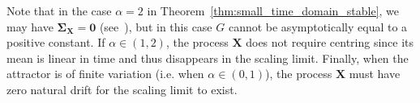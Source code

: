 \documentclass[en,oneside,bbfont,article]{amsart}
\theoremstyle{remark}
\theoremstyle{definition}
\theoremstyle{definition}
\newcommand\1{\mathds{1}}
\begin{document}
Note that in the case $\alpha=2$ in Theorem~\ref{thm:small_time_domain_stable},
we may have $\bm{\Sigma_X}=\bm{0}$ (see~\cite[Ex.~5.7]{WassersteinPaper}), but in this case $G$ cannot be asymptotically equal to a positive constant. If $\alpha\in(1,2)$, the process $\bm{X}$ does not require centring since its mean is linear in time and thus disappears in the scaling limit. Finally, when the attractor is of finite variation (i.e. when $\alpha\in(0,1)$), the process $\bm{X}$ must have zero natural drift for the scaling limit to exist.
\end{document}
